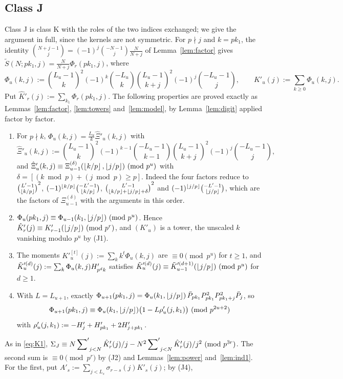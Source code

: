 \documentclass[11pt]{amsart}
\begin{document}
\subsection{Class J}
Class J is class K with the roles of the two indices exchanged; we give the argument in full, since the kernels are not symmetric. For $p\nmid j$ and $k=pk_1$, the identity $\binom{N+j-1}j=(-1)^j\binom{-N-1}j\frac N{N+j}$ of Lemma~\ref{lem:factor} gives $\tilde S(N;pk_1,j)=\frac N{N+j}\Phi_r(pk_1,j)$, where
\[ \Phi_u(k,j):=\binom{L_u-1}k^2(-1)^k\binom{-L_u}k\binom{L_u-1}{k+j}^2(-1)^j\binom{-L_u-1}j,\qquad K'_u(j):=\sum_{k\ge0}\Phi_u(k,j). \]
Put $\hat K'_r(j):=\sum_{k_1}\Phi_r(pk_1,j)$. The following properties are proved exactly as Lemmas~\ref{lem:factor}, \ref{lem:towers} and~\ref{lem:model}, by Lemma~\ref{lem:digit} applied factor by factor.
\begin{enumerate}[label=(J\arabic*)]
\item For $p\nmid k$, $\Phi_u(k,j)=\frac{L_u}k\hat\Xi'_u(k,j)$ with
\[ \hat\Xi'_u(k,j):=\binom{L_u-1}k^2(-1)^{k-1}\binom{-L_u-1}{k-1}\binom{L_u-1}{k+j}^2(-1)^j\binom{-L_u-1}j, \]
and $\hat\Xi'_u(k,j)\equiv\Xi^{(\delta)}_{u-1}(\left\lfloor k/p\right\rfloor,\left\lfloor j/p\right\rfloor)\ (\mathrm{mod}\ p^u)$ with $\delta=[(k\bmod p)+(j\bmod p)\ge p]$. Indeed the four factors reduce to $\binom{L'-1}{\left\lfloor k/p\right\rfloor}^2$, $(-1)^{\left\lfloor k/p\right\rfloor}\binom{-L'-1}{\left\lfloor k/p\right\rfloor}$, $\binom{L'-1}{\left\lfloor k/p\right\rfloor+\left\lfloor j/p\right\rfloor+\delta}^2$ and $(-1)^{\left\lfloor j/p\right\rfloor}\binom{-L'-1}{\left\lfloor j/p\right\rfloor}$, which are the factors of $\Xi^{(\delta)}_{u-1}$ with the arguments in this order.
\item $\Phi_u(pk_1,j)\equiv\Phi_{u-1}(k_1,\left\lfloor j/p\right\rfloor)\ (\mathrm{mod}\ p^u)$. Hence $\hat K'_r(j)\equiv K'_{r-1}(\left\lfloor j/p\right\rfloor)\ (\mathrm{mod}\ p^r)$, and $(K'_u)$ is a tower, the unscaled $k$ vanishing modulo $p^u$ by (J1).
\item The moments $K'^{[t]}_u(j):=\sum_kk^t\Phi_u(k,j)$ are $\equiv0\pmod{p^u}$ for $t\ge1$, and $\tilde K'^{(d)}_u(j):=\sum_k\Phi_u(k,j)H'_{p^dk}$ satisfies $\tilde K'^{(d)}_u(j)\equiv\tilde K'^{(d+1)}_{u-1}(\left\lfloor j/p\right\rfloor)\ (\mathrm{mod}\ p^u)$ for $d\ge1$.
\item With $L=L_{u+1}$, exactly $\Phi_{u+1}(pk_1,j)=\Phi_u(k_1,\left\lfloor j/p\right\rfloor)\,\bar P_{pk_1}P_{pk_1}^2P_{pk_1+j}^2\bar P_j$, so
\[ \Phi_{u+1}(pk_1,j)\equiv\Phi_u(k_1,\left\lfloor j/p\right\rfloor)\bigl(1-L\rho'_u(j,k_1)\bigr)\ (\mathrm{mod}\ p^{2u+2}) \]
with $\rho'_u(j,k_1):=-H'_j+H'_{pk_1}+2H'_{j+pk_1}$.
\end{enumerate}
As in \eqref{eq:K1}, $\Sigma_J\equiv N\sideset{}{'}\sum_{j<N}\hat K'_r(j)/j-N^2\sideset{}{'}\sum_{j<N}\hat K'_r(j)/j^2\ (\mathrm{mod}\ p^{3r})$. The second sum is $\equiv0\pmod{p^r}$ by (J2) and Lemmas~\ref{lem:power} and~\ref{lem:ind1}. For the first, put $A'_s:=\sum_{j<L_s}\sigma_{r-s}(j)K'_s(j)$; by (J4),
\end{document}

